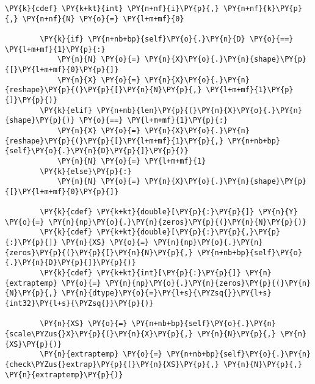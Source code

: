 \begin{Verbatim}[commandchars=\\\{\}]
        \PY{k}{cdef} \PY{k+kt}{int} \PY{n+nf}{i}\PY{p}{,} \PY{n+nf}{k}\PY{p}{,} \PY{n+nf}{N} \PY{o}{=} \PY{l+m+mf}{0}
        
        \PY{k}{if} \PY{n+nb+bp}{self}\PY{o}{.}\PY{n}{D} \PY{o}{==} \PY{l+m+mf}{1}\PY{p}{:}
            \PY{n}{N} \PY{o}{=} \PY{n}{X}\PY{o}{.}\PY{n}{shape}\PY{p}{[}\PY{l+m+mf}{0}\PY{p}{]}
            \PY{n}{X} \PY{o}{=} \PY{n}{X}\PY{o}{.}\PY{n}{reshape}\PY{p}{(}\PY{p}{[}\PY{n}{N}\PY{p}{,} \PY{l+m+mf}{1}\PY{p}{]}\PY{p}{)}
        \PY{k}{elif} \PY{n+nb}{len}\PY{p}{(}\PY{n}{X}\PY{o}{.}\PY{n}{shape}\PY{p}{)} \PY{o}{==} \PY{l+m+mf}{1}\PY{p}{:}
            \PY{n}{X} \PY{o}{=} \PY{n}{X}\PY{o}{.}\PY{n}{reshape}\PY{p}{(}\PY{p}{[}\PY{l+m+mf}{1}\PY{p}{,} \PY{n+nb+bp}{self}\PY{o}{.}\PY{n}{D}\PY{p}{]}\PY{p}{)}
            \PY{n}{N} \PY{o}{=} \PY{l+m+mf}{1}
        \PY{k}{else}\PY{p}{:}
            \PY{n}{N} \PY{o}{=} \PY{n}{X}\PY{o}{.}\PY{n}{shape}\PY{p}{[}\PY{l+m+mf}{0}\PY{p}{]}

        \PY{k}{cdef} \PY{k+kt}{double}[\PY{p}{:}\PY{p}{]} \PY{n}{Y} \PY{o}{=} \PY{n}{np}\PY{o}{.}\PY{n}{zeros}\PY{p}{(}\PY{n}{N}\PY{p}{)}
        \PY{k}{cdef} \PY{k+kt}{double}[\PY{p}{:}\PY{p}{,}\PY{p}{:}\PY{p}{]} \PY{n}{XS} \PY{o}{=} \PY{n}{np}\PY{o}{.}\PY{n}{zeros}\PY{p}{(}\PY{p}{[}\PY{n}{N}\PY{p}{,} \PY{n+nb+bp}{self}\PY{o}{.}\PY{n}{D}\PY{p}{]}\PY{p}{)}
        \PY{k}{cdef} \PY{k+kt}{int}[\PY{p}{:}\PY{p}{]} \PY{n}{extraptemp} \PY{o}{=} \PY{n}{np}\PY{o}{.}\PY{n}{zeros}\PY{p}{(}\PY{n}{N}\PY{p}{,} \PY{n}{dtype}\PY{o}{=}\PY{l+s}{\PYZsq{}}\PY{l+s}{int32}\PY{l+s}{\PYZsq{}}\PY{p}{)}
        
        \PY{n}{XS} \PY{o}{=} \PY{n+nb+bp}{self}\PY{o}{.}\PY{n}{scale\PYZus{}X}\PY{p}{(}\PY{n}{X}\PY{p}{,} \PY{n}{N}\PY{p}{,} \PY{n}{XS}\PY{p}{)} 
        \PY{n}{extraptemp} \PY{o}{=} \PY{n+nb+bp}{self}\PY{o}{.}\PY{n}{check\PYZus{}extrap}\PY{p}{(}\PY{n}{XS}\PY{p}{,} \PY{n}{N}\PY{p}{,} \PY{n}{extraptemp}\PY{p}{)}
        

\end{Verbatim}
